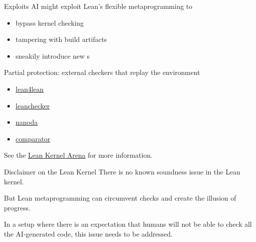 \documentclass{beamer}
\newcommand{\cverb}[1]{{\color{purple}{\texttt{#1}}}}
\begin{document}
\begin{frame}{Exploits}
AI might exploit Lean's flexible metaprogramming to

\medskip

\begin{itemize}
  \item bypass kernel checking
  \smallskip
  \item tampering with build artifacts
  \smallskip
  \item sneakily introduce new \cverb{axiom}s
\end{itemize}

\bigskip

Partial protection: external checkers that replay the environment

\begin{center}
\begin{minipage}[t]{0.28\linewidth}
\begin{itemize}
  \item \href{https://github.com/fgdorais/lean4lean}{lean4lean}
  \smallskip
  \item \href{https://github.com/leanprover/leanchecker}{leanchecker}
\end{itemize}
\end{minipage}\hspace{30pt}
\begin{minipage}[t]{0.28\linewidth}
\begin{itemize}
  \item \href{https://github.com/nanoda/}{nanoda}
  \smallskip
  \item \href{https://github.com/leanprover-community/lean-comparator}{comparator}
\end{itemize}
\end{minipage}
\end{center}

\medskip

See the \href{https://arena.lean-lang.org/}{Lean Kernel Arena} for more information.
\end{frame}

\begin{frame}{Disclaimer on the Lean Kernel}
There is no known soundness issue in the Lean kernel.

\bigskip

But Lean metaprogramming can circumvent checks and create the illusion of progress.

\bigskip

In a setup where there is an expectation that humans will not be able to check all the AI-generated code, this issue needs to be addressed.
\end{frame}
\end{document}

